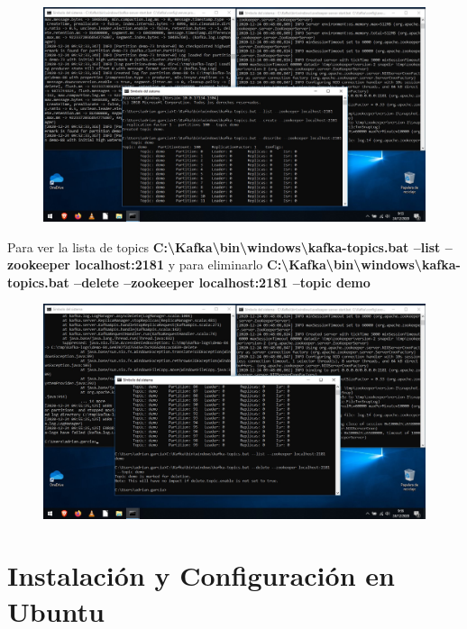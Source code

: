 \documentclass[a4paper,10pt]{article}
\begin{document}
\begin{figure}[H]
\begin{center}
\includegraphics[width=450pt]{./fotos/Kafka/12.jpg}
\end{center}
\end{figure}

Para ver la lista de topics \textbf{C:\textbackslash Kafka\textbackslash bin\textbackslash windows\textbackslash kafka-topics.bat --list --zookeeper localhost:2181} y para eliminarlo \textbf{C:\textbackslash Kafka\textbackslash bin\textbackslash windows\textbackslash kafka-topics.bat --delete --zookeeper localhost:2181 --topic demo}

\begin{figure}[H]
\begin{center}
\includegraphics[width=450pt]{./fotos/Kafka/13.jpg}
\end{center}
\end{figure}

\section{Instalación y Configuración en Ubuntu}
\end{document}
